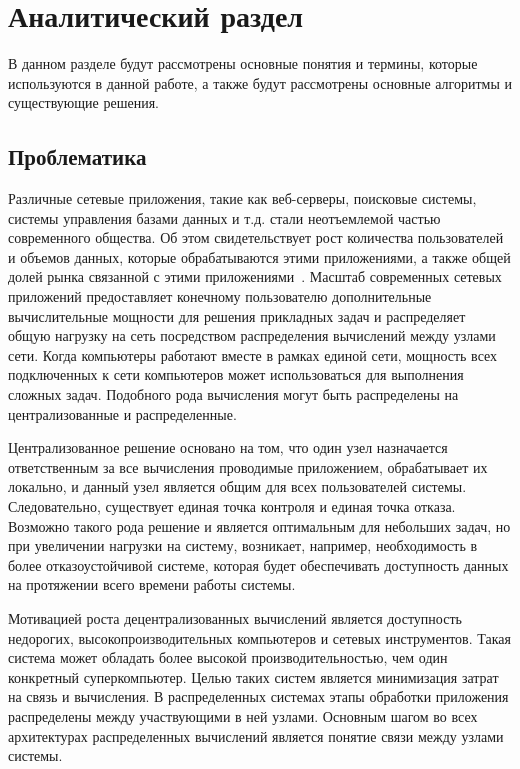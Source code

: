 
\section{Аналитический раздел}

В данном разделе будут рассмотрены основные понятия и термины, которые используются в данной работе, а также будут рассмотрены основные алгоритмы и существующие решения. 

\subsection{Проблематика}

Различные сетевые приложения, такие как веб-серверы, поисковые системы, системы управления базами данных и т.д. стали неотъемлемой частью современного общества. 
Об этом свидетельствует рост количества пользователей и объемов данных, которые обрабатываются этими приложениями, а также общей долей рынка связанной с этими приложениями~\cite{iot-market}.
Масштаб современных сетевых приложений предоставляет конечному пользователю дополнительные вычислительные мощности для решения прикладных задач и распределяет общую нагрузку на сеть посредством распределения вычислений между узлами сети.
Когда компьютеры работают вместе в рамках единой сети, мощность всех подключенных к сети компьютеров может использоваться для выполнения сложных задач.
Подобного рода вычисления могут быть распределены на централизованные и распределенные.

Централизованное решение основано на том, что один узел назначается ответственным за все вычисления проводимые приложением, обрабатывает их локально, и данный узел является общим для всех пользователей системы.
Следовательно, существует единая точка контроля и единая точка отказа. 
Возможно такого рода решение и является оптимальным для небольших задач, но при увеличении нагрузки на систему, возникает, например, необходимость в более отказоустойчивой системе, которая будет обеспечивать доступность данных на протяжении всего времени работы системы.

Мотивацией роста децентрализованных вычислений является доступность недорогих, высокопроизводительных компьютеров и сетевых инструментов. 
Такая система может обладать более высокой производительностью, чем один конкретный суперкомпьютер. 
Целью таких систем является минимизация затрат на связь и вычисления. 
В распределенных системах этапы обработки приложения распределены между участвующими в ней узлами. 
Основным шагом во всех архитектурах распределенных вычислений является понятие связи между узлами системы.

